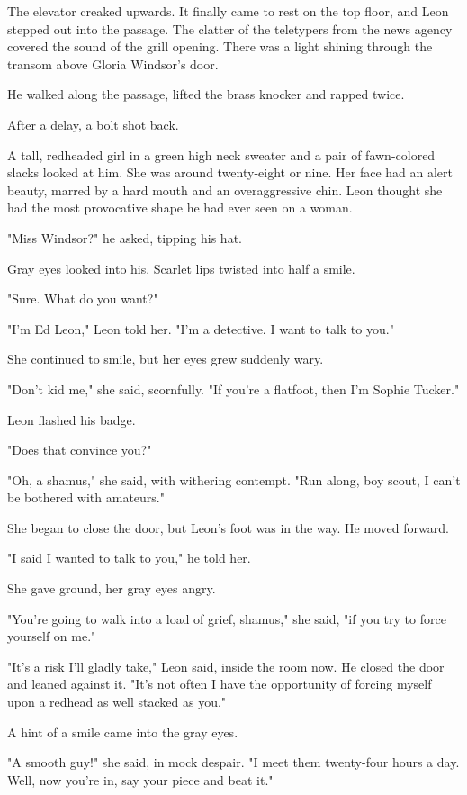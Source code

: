 \documentclass{novel}
\begin{document}
The elevator creaked upwards. It finally came to rest on the top floor, and Leon stepped out into the passage. The clatter of the teletypers from the news agency covered the sound of the grill opening. There was a light shining through the transom above Gloria Windsor's door.

He walked along the passage, lifted the brass knocker and rapped twice.

After a delay, a bolt shot back.

A tall, redheaded girl in a green high neck sweater and a pair of fawn-colored slacks looked at him. She was around twenty-eight or \-nine. Her face had an alert beauty, marred by a hard mouth and an overaggressive chin. Leon thought she had the most provocative shape he had ever seen on a woman.

"Miss Windsor?" he asked, tipping his hat.

Gray eyes looked into his. Scarlet lips twisted into half a smile.

"Sure. What do you want?"

"I'm Ed Leon," Leon told her. "I'm a detective. I want to talk to you."

She continued to smile, but her eyes grew suddenly wary.

"Don't kid me," she said, scornfully. "If you're a flatfoot, then I'm Sophie Tucker."

Leon flashed his badge.

"Does that convince you?"

"Oh, a shamus," she said, with withering contempt. "Run along, boy scout, I can't be bothered with amateurs."

She began to close the door, but Leon's foot was in the way. He moved forward.

"I said I wanted to talk to you," he told her.

She gave ground, her gray eyes angry.

"You're going to walk into a load of grief, shamus," she said, "if you try to force yourself on me."

"It's a risk I'll gladly take," Leon said, inside the room now. He closed the door and leaned against it. "It's not often I have the opportunity of forcing myself upon a redhead as well stacked as you."

A hint of a smile came into the gray eyes.

"A smooth guy!" she said, in mock despair. "I meet them twenty-four hours a day. Well, now you're in, say your piece and beat it."
\end{document}
